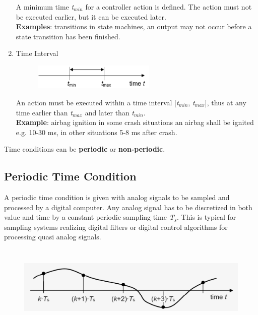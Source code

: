 \begin{enumerate}
A minimum time \textit{t}${}_{min}$ for a controller action is defined. The action must not be executed earlier, but it can be executed later. \\
\textbf{Examples}: transitions in state machines, an output may not occur before a state       transition has been finished.

\item Time Interval  

	\begin{figure}[h]
    \centering
    \includegraphics[width=6cm, height=1.2cm]{Images/image65.png}
    \label{fig:Fig 11}
    \end{figure}

An action must be executed within a time interval [\textit{t}${}_{min}$, \textit{t}${}_{max}$], thus at any time earlier than \textit{t}${}_{max}$ and later than\textit{ t}${}_{min}$.\\
\textbf{Example}:  airbag ignition in some crash situations an airbag shall be ignited      e.g. 10-30 ms, in other situations 5-8 ms after crash.
\end{enumerate}

Time conditions can be \textbf{periodic} or \textbf{non-periodic}. 

\subsection{Periodic Time Condition}

A periodic time condition is given with analog signals to be sampled and processed by a digital computer. Any analog signal has to be discretized in both value and time by a constant periodic sampling time \textit{T}${}_{s}$. This is typical for sampling systems realizing digital filters or digital control algorithms for processing quasi analog signals.

	\begin{figure}[h]
    \centering
    \includegraphics[width=12cm, height=4cm]{Images/image66.png}
    \label{fig:Fig 12}
    \end{figure}

